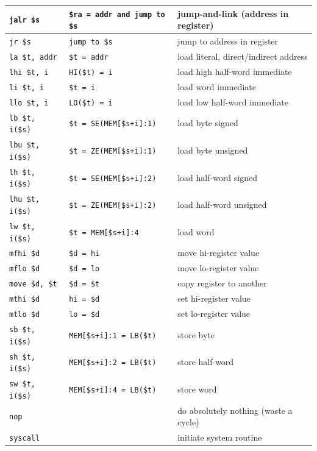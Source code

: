 \documentclass[12pt]{article}
\begin{document}
\begin{longtable}{l || l | l}
    \texttt{jalr  \$s} & \texttt{\$ra = addr and jump to \$s} & jump-and-link (address in register)\\ \hline
    \texttt{jr    \$s} & \texttt{jump to \$s} & jump to address in register\\
    \hhline{=#=|=}
    \texttt{la    \$t, addr} & \texttt{\$t = addr} & load literal, direct/indirect address\\ \hline
    \texttt{lhi   \$t, i} & \texttt{HI(\$t) = i} & load high half-word immediate\\ \hline
    \texttt{li    \$t, i} & \texttt{\$t = i} & load word immediate\\ \hline
    \texttt{llo   \$t, i} & \texttt{LO(\$t) = i} & load low half-word immediate\\ \hline
    \texttt{lb    \$t, i(\$s)} & \texttt{\$t = SE(MEM[\$s+i]:1)} & load byte signed\\ \hline
    \texttt{lbu   \$t, i(\$s)} & \texttt{\$t = ZE(MEM[\$s+i]:1)} & load byte unsigned\\ \hline
    \texttt{lh    \$t, i(\$s)} & \texttt{\$t = SE(MEM[\$s+i]:2)} & load half-word signed\\ \hline
    \texttt{lhu   \$t, i(\$s)} & \texttt{\$t = ZE(MEM[\$s+i]:2)} & load half-word unsigned\\ \hline
    \texttt{lw    \$t, i(\$s)} & \texttt{\$t = MEM[\$s+i]:4} & load word\\ \hline
    \texttt{mfhi  \$d} & \texttt{\$d = hi} & move hi-register value\\ \hline
    \texttt{mflo  \$d} & \texttt{\$d = lo} & move lo-register value\\ \hline
    \texttt{move  \$d, \$t} & \texttt{\$d = \$t} & copy register to another\\ \hline
    \texttt{mthi  \$d} & \texttt{hi = \$d} & set hi-register value\\ \hline
    \texttt{mtlo  \$d} & \texttt{lo = \$d} & set lo-register value\\ \hline
    \texttt{sb    \$t, i(\$s)} & \texttt{MEM[\$s+i]:1 = LB(\$t)} & store byte\\ \hline
    \texttt{sh    \$t, i(\$s)} & \texttt{MEM[\$s+i]:2 = LB(\$t)} & store half-word\\ \hline
    \texttt{sw    \$t, i(\$s)} & \texttt{MEM[\$s+i]:4 = LB(\$t)} & store word\\
    \hhline{=#=|=}
    \texttt{nop} & & do absolutely nothing (waste a cycle)\\ \hline
    \texttt{syscall} & & initiate system routine
\end{longtable}
\end{document}
